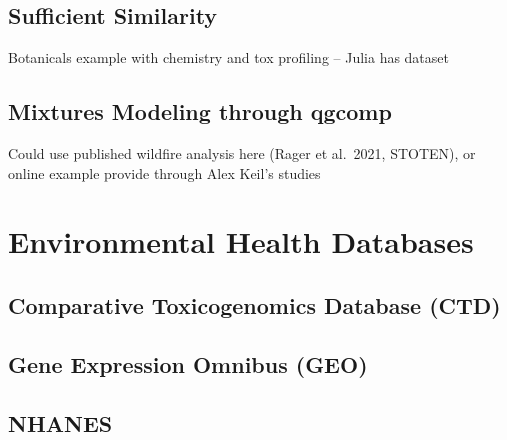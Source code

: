 \documentclass[
]{book}
\begin{document}
\hypertarget{sufficient-similarity}{%
\section{Sufficient Similarity}\label{sufficient-similarity}}

Botanicals example with chemistry and tox profiling -- Julia has dataset

\hypertarget{mixtures-modeling-through-qgcomp}{%
\section{Mixtures Modeling through qgcomp}\label{mixtures-modeling-through-qgcomp}}

Could use published wildfire analysis here (Rager et al.~2021, STOTEN), or online example provide through Alex Keil's studies

\hypertarget{environmental-health-databases}{%
\chapter{Environmental Health Databases}\label{environmental-health-databases}}

\hypertarget{comparative-toxicogenomics-database-ctd}{%
\section{Comparative Toxicogenomics Database (CTD)}\label{comparative-toxicogenomics-database-ctd}}

\hypertarget{gene-expression-omnibus-geo}{%
\section{Gene Expression Omnibus (GEO)}\label{gene-expression-omnibus-geo}}

\hypertarget{nhanes}{%
\section{NHANES}\label{nhanes}}
\end{document}
